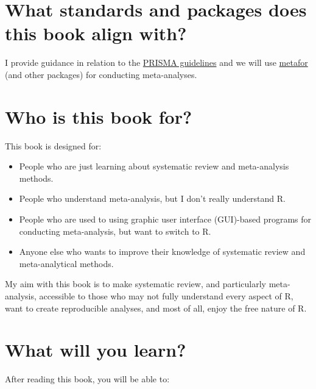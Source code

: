 \documentclass[
]{book}
\begin{document}
\hypertarget{what-standards-and-packages-does-this-book-align-with}{%
\section*{What standards and packages does this book align with?}\label{what-standards-and-packages-does-this-book-align-with}}

I provide guidance in relation to the \href{http://www.prisma-statement.org/}{PRISMA guidelines} \citep{page2021} and we will use \href{http://www.metafor-project.org/doku.php/metafor}{metafor} \citep{viechtbauer2010} (and other packages) for conducting meta-analyses.

\hypertarget{who-is-this-book-for}{%
\section*{Who is this book for?}\label{who-is-this-book-for}}

This book is designed for:

\begin{itemize}
\item
  People who are just learning about systematic review and meta-analysis methods.
\item
  People who understand meta-analysis, but I don't really understand R.
\item
  People who are used to using graphic user interface (GUI)-based programs for conducting meta-analysis, but want to switch to R.
\item
  Anyone else who wants to improve their knowledge of systematic review and meta-analytical methods.
\end{itemize}

My aim with this book is to make systematic review, and particularly meta-analysis, accessible to those who may not fully understand every aspect of R, want to create reproducible analyses, and most of all, enjoy the free nature of R.

\hypertarget{what-will-you-learn}{%
\section*{What will you learn?}\label{what-will-you-learn}}

After reading this book, you will be able to:
\end{document}

